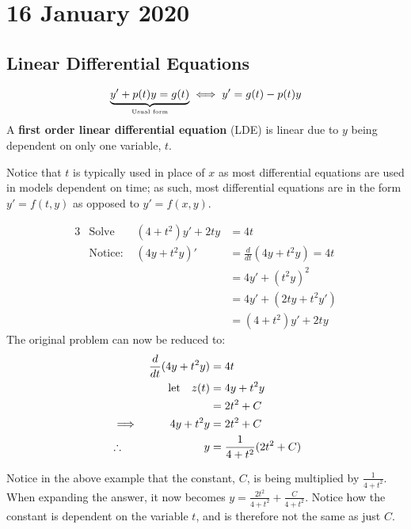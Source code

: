 \documentclass[twoside]{report}
\begin{document}
    \chapter{16 January 2020}
    \section{Linear Differential Equations}
    \begin{definition}
        \begin{equation}
            \underbrace{y' + p(t)y = g(t)}_\text{\tiny Usual form}\iff y' = g(t) - p(t)y
        \end{equation}
        A \textbf{first order linear differential equation} (LDE) is linear due to $y$ being dependent on only one variable, $t$.
    \end{definition}
    Notice that $t$ is typically used in place of $x$ as most differential equations are used in models dependent on time; as such, most differential equations are in the form $y' = f(t, y)$ as opposed to $y' = f(x, y)$.
    \begin{example}
        \begin{alignat}{3}
            &\text{Solve } &(4 + t^{2})y' + 2ty &= 4t\\
            &\text{Notice: }&(4y + t^{2}y)' &= \frac{d}{dt}(4y + t^{2}y) = 4t\\
            &&&= 4y' + (t^{2}y)^{2}\\
            &&&= 4y' + (2ty + t^{2}y')\\
            &&&= (4 + t^2)y' + 2ty
        \end{alignat}
        The original problem can now be reduced to:
        \begin{alignat}{3}
            &&\frac{d}{dt}(4y + t^2y)&= 4t\\
            &&\text{let\quad}z(t) &= 4y + t^{2}y\\
            &&&= 2 t^{2} + C\\
            &\implies& 4y + t^{2}y &= 2 t^{2}+C\\
            &\therefore& y &= \frac{1}{4+t^{2}}(2 t^{2}+C)
        \end{alignat}
    \end{example}
    \begin{remark}[Constants]
        Notice in the above example that the constant, $C$, is being multiplied by $\frac{1}{4 + t^{2}}$. When expanding the answer, it now becomes $y = \frac{2t^{2}}{4+t^{2}} + \frac{C}{4+t^{2}}$. Notice how the constant is dependent on the variable $t$, and is therefore not the same as just $C$.
    \end{remark}
\end{document}
